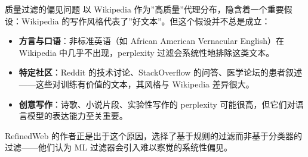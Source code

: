 \begin{warningbox}{质量过滤的偏见问题}
以 Wikipedia 作为”高质量”代理分布，隐含着一个重要假设：Wikipedia 的写作风格代表了”好文本”。但这个假设并不总是成立：
\begin{itemize}
    \item \textbf{方言与口语}：非标准英语（如 African American Vernacular English）在 Wikipedia 中几乎不出现，perplexity 过滤会系统性地排除这类文本。
    \item \textbf{特定社区}：Reddit 的技术讨论、StackOverflow 的问答、医学论坛的患者叙述——这些对训练有价值的文本，其风格与 Wikipedia 差异很大。
    \item \textbf{创意写作}：诗歌、小说片段、实验性写作的 perplexity 可能很高，但它们对语言模型的表达能力至关重要。
\end{itemize}
RefinedWeb 的作者正是出于这个原因，选择了基于规则的过滤而非基于分类器的过滤——他们认为 ML 过滤器会引入难以察觉的系统性偏见。
\end{warningbox}

